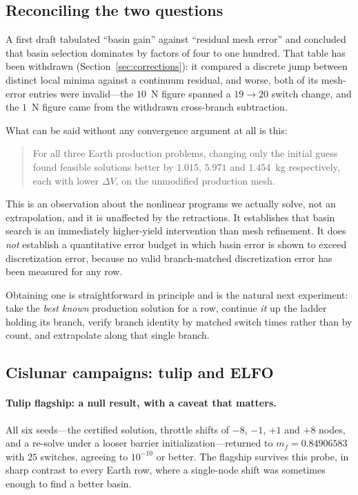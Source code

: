 \documentclass[11pt]{article}
\newcommand{\mf}{m_f}
\newcommand{\dV}{\Delta V}
\begin{document}
\subsection{Reconciling the two questions}

A first draft tabulated ``basin gain'' against ``residual mesh error'' and
concluded that basin selection dominates by factors of four to one hundred.
That table has been withdrawn (Section~\ref{sec:corrections}): it compared a
discrete jump between distinct local minima against a continuum residual, and
worse, both of its mesh-error entries were invalid---the $10$~N figure spanned
a $19\to20$ switch change, and the $1$~N figure came from the withdrawn
cross-branch subtraction.

What can be said without any convergence argument at all is this:

\begin{quote}
For all three Earth production problems, changing only the initial guess found
feasible solutions better by $1.015$, $5.971$ and $1.454$~kg respectively, each
with lower $\dV$, on the unmodified production mesh.
\end{quote}

This is an observation about the nonlinear programs we actually solve, not an
extrapolation, and it is unaffected by the retractions. It establishes that
basin search is an immediately higher-yield intervention than mesh refinement.
It does \emph{not} establish a quantitative error budget in which basin error
is shown to exceed discretization error, because no valid branch-matched
discretization error has been measured for any row.

Obtaining one is straightforward in principle and is the natural next
experiment: take the \emph{best known} production solution for a row, continue
\emph{it} up the ladder holding its branch, verify branch identity by matched
switch times rather than by count, and extrapolate along that single branch.

\subsection{Cislunar campaigns: tulip and ELFO}
\label{sec:cr3bp}

\paragraph{Tulip flagship: a null result, with a caveat that matters.} All six
seeds---the certified solution, throttle shifts of $-8$, $-1$, $+1$ and $+8$
nodes, and a re-solve under a looser barrier initialization---returned to
$\mf = 0.84906583$ with $25$ switches, agreeing to $10^{-10}$ or better. The
flagship survives this probe, in sharp contrast to every Earth row, where a
single-node shift was sometimes enough to find a better basin.
\end{document}
